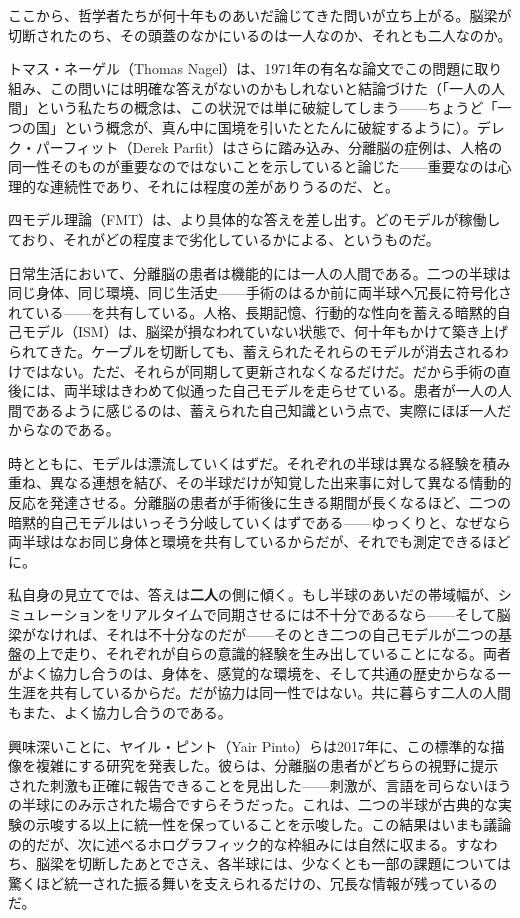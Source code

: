 \documentclass[11pt, twoside, openright]{book}
\begin{document}
ここから、哲学者たちが何十年ものあいだ論じてきた問いが立ち上がる。脳梁が切断されたのち、その頭蓋のなかにいるのは一人なのか、それとも二人なのか。

トマス・ネーゲル（Thomas Nagel）は、1971年の有名な論文でこの問題に取り組み、この問いには明確な答えがないのかもしれないと結論づけた（「一人の人間」という私たちの概念は、この状況では単に破綻してしまう------ちょうど「一つの国」という概念が、真ん中に国境を引いたとたんに破綻するように）。デレク・パーフィット（Derek Parfit）はさらに踏み込み、分離脳の症例は、人格の同一性そのものが重要なのではないことを示していると論じた------重要なのは心理的な連続性であり、それには程度の差がありうるのだ、と。

四モデル理論（FMT）は、より具体的な答えを差し出す。どのモデルが稼働しており、それがどの程度まで劣化しているかによる、というものだ。

日常生活において、分離脳の患者は機能的には一人の人間である。二つの半球は同じ身体、同じ環境、同じ生活史------手術のはるか前に両半球へ冗長に符号化されている------を共有している。人格、長期記憶、行動的な性向を蓄える暗黙的自己モデル（ISM）は、脳梁が損なわれていない状態で、何十年もかけて築き上げられてきた。ケーブルを切断しても、蓄えられたそれらのモデルが消去されるわけではない。ただ、それらが同期して更新されなくなるだけだ。だから手術の直後には、両半球はきわめて似通った自己モデルを走らせている。患者が一人の人間であるように感じるのは、蓄えられた自己知識という点で、実際にほぼ一人だからなのである。

時とともに、モデルは漂流していくはずだ。それぞれの半球は異なる経験を積み重ね、異なる連想を結び、その半球だけが知覚した出来事に対して異なる情動的反応を発達させる。分離脳の患者が手術後に生きる期間が長くなるほど、二つの暗黙的自己モデルはいっそう分岐していくはずである------ゆっくりと、なぜなら両半球はなお同じ身体と環境を共有しているからだが、それでも測定できるほどに。

私自身の見立てでは、答えは\textbf{二人}の側に傾く。もし半球のあいだの帯域幅が、シミュレーションをリアルタイムで同期させるには不十分であるなら------そして脳梁がなければ、それは不十分なのだが------そのとき二つの自己モデルが二つの基盤の上で走り、それぞれが自らの意識的経験を生み出していることになる。両者がよく協力し合うのは、身体を、感覚的な環境を、そして共通の歴史からなる一生涯を共有しているからだ。だが協力は同一性ではない。共に暮らす二人の人間もまた、よく協力し合うのである。

興味深いことに、ヤイル・ピント（Yair Pinto）らは2017年に、この標準的な描像を複雑にする研究を発表した。彼らは、分離脳の患者がどちらの視野に提示された刺激も正確に報告できることを見出した------刺激が、言語を司らないほうの半球にのみ示された場合ですらそうだった。これは、二つの半球が古典的な実験の示唆する以上に統一性を保っていることを示唆した。この結果はいまも議論の的だが、次に述べるホログラフィック的な枠組みには自然に収まる。すなわち、脳梁を切断したあとでさえ、各半球には、少なくとも一部の課題については驚くほど統一された振る舞いを支えられるだけの、冗長な情報が残っているのだ。
\end{document}
